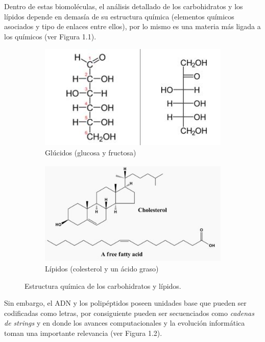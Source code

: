 Dentro de estas biomoléculas, el análisis detallado de los carbohidratos y los lípidos depende en demasía de su estructura química (elementos químicos asociados y tipo de enlaces entre ellos), por lo mismo es una materia más ligada a los químicos (ver Figura 1.1). 

\begin{figure}[H] 

\begin{subfigure}{0.5\textwidth}
\includegraphics[width=0.9\linewidth, height=5cm]{./images/glucidoejemplos} 
\caption{Glúcidos (glucosa y fructosa)}
\label{fig:subim1}
\end{subfigure}
\begin{subfigure}{0.4\textwidth}
\includegraphics[width=1\linewidth, height=5cm]{./images/lipidosejemplos}
\caption{Lípidos (colesterol y un ácido graso)}
\label{fig:subim2}
\end{subfigure}
 
\caption{Estructura química de los carbohidratos y lípidos.}
\label{fig:image1}
\end{figure}

Sin embargo, el ADN y los polipéptidos poseen unidades base que pueden ser codificadas como letras, por consiguiente pueden ser secuenciados como {\it{cadenas de strings}} y en donde los avances computacionales y la evolución informática toman una importante relevancia (ver Figura 1.2).

